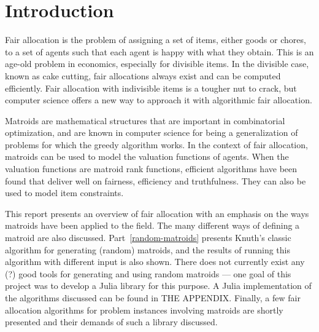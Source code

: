 \section{Introduction}

Fair allocation is the problem of assigning a set of items, either goods or chores, to a set of agents such that each agent is happy with what they obtain. This is an age-old problem in economics, especially for divisible items. In the divisible case, known as cake cutting, fair allocations always exist and can be computed efficiently. Fair allocation with indivisible items is a tougher nut to crack, but computer science offers a new way to approach it with algorithmic fair allocation.

Matroids are mathematical structures that are important in combinatorial optimization, and are known in computer science for being a generalization of problems for which the greedy algorithm works. In the context of fair allocation, matroids can be used to model the valuation functions of agents. When the valuation functions are matroid rank functions, efficient algorithms have been found that deliver well on fairness, efficiency and truthfulness. They can also be used to model item constraints.

This report presents an overview of fair allocation with an emphasis on the ways matroids have been applied to the field. The many different ways of defining a matroid are also discussed. Part \ref{random-matroids} presents Knuth's classic algorithm for generating (random) matroids, and the results of running this algorithm with different input is also shown. There does not currently exist any (?) good tools for generating and using random matroids --- one goal of this project was to develop a Julia library for this purpose. A Julia implementation of the algorithms discussed can be found in THE APPENDIX. Finally, a few fair allocation algorithms for problem instances involving matroids are shortly presented and their demands of such a library discussed.


